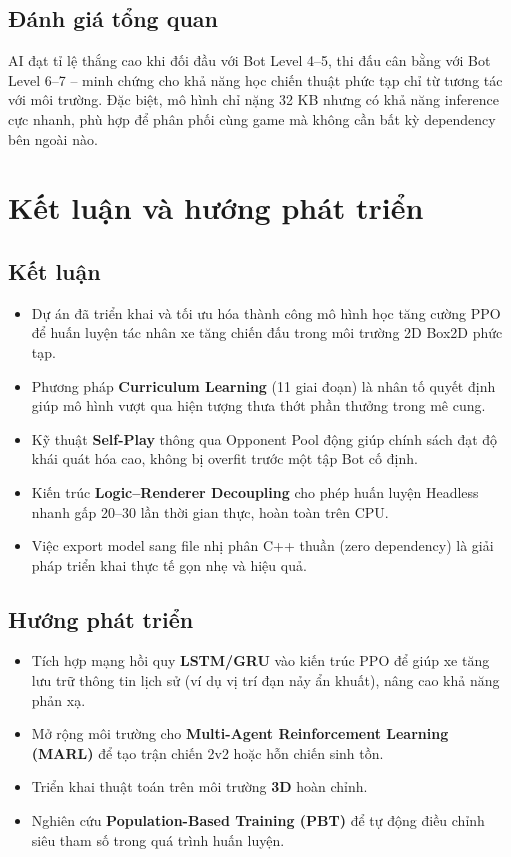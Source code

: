\documentclass[a4paper, 12pt]{report}
\begin{document}
  \section{Đánh giá tổng quan}


  AI đạt tỉ lệ thắng cao khi đối đầu với Bot Level 4--5, thi đấu cân bằng với Bot Level 6--7 -- minh chứng cho khả năng học chiến thuật phức tạp chỉ từ tương tác với môi trường. Đặc biệt, mô hình chỉ nặng 32 KB nhưng có khả năng inference cực nhanh, phù hợp để phân phối cùng game mà không cần bất kỳ dependency bên ngoài nào.

  \chapter{Kết luận và hướng phát triển}

  \section{Kết luận}

  \begin{itemize}
    \item Dự án đã triển khai và tối ưu hóa thành công mô hình học tăng cường PPO để huấn luyện tác nhân xe tăng chiến đấu trong môi trường 2D Box2D phức tạp.
    \item Phương pháp \textbf{Curriculum Learning} (11 giai đoạn) là nhân tố quyết định giúp mô hình vượt qua hiện tượng thưa thớt phần thưởng trong mê cung.
    \item Kỹ thuật \textbf{Self-Play} thông qua Opponent Pool động giúp chính sách đạt độ khái quát hóa cao, không bị overfit trước một tập Bot cố định.
    \item Kiến trúc \textbf{Logic--Renderer Decoupling} cho phép huấn luyện Headless nhanh gấp 20--30 lần thời gian thực, hoàn toàn trên CPU.
    \item Việc export model sang file nhị phân C++ thuần (zero dependency) là giải pháp triển khai thực tế gọn nhẹ và hiệu quả.
  \end{itemize}

  \section{Hướng phát triển}

  \begin{itemize}
    \item Tích hợp mạng hồi quy \textbf{LSTM/GRU} vào kiến trúc PPO để giúp xe tăng lưu trữ thông tin lịch sử (ví dụ vị trí đạn nảy ẩn khuất), nâng cao khả năng phản xạ.
    \item Mở rộng môi trường cho \textbf{Multi-Agent Reinforcement Learning (MARL)} để tạo trận chiến 2v2 hoặc hỗn chiến sinh tồn.
    \item Triển khai thuật toán trên môi trường \textbf{3D} hoàn chỉnh.
    \item Nghiên cứu \textbf{Population-Based Training (PBT)} để tự động điều chỉnh siêu tham số trong quá trình huấn luyện.
  \end{itemize}
\end{document}
